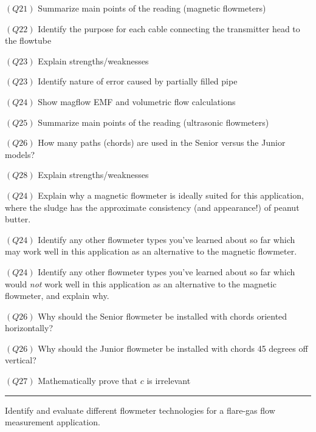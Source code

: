 \medskip
\item{$(Q21)$} Summarize main points of the reading (magnetic flowmeters)
\item{$(Q22)$} Identify the purpose for each cable connecting the transmitter head to the flowtube
\item{$(Q23)$} Explain strengths/weaknesses
\item{$(Q23)$} Identify nature of error caused by partially filled pipe
\item{$(Q24)$} Show magflow EMF and volumetric flow calculations
\item{$(Q25)$} Summarize main points of the reading (ultrasonic flowmeters)
\item{$(Q26)$} How many paths (chords) are used in the Senior versus the Junior models?
\item{$(Q28)$} Explain strengths/weaknesses
\medskip

\medskip
\item{$(Q24)$} Explain why a magnetic flowmeter is ideally suited for this application, where the sludge has the approximate consistency (and appearance!) of peanut butter.
\item{$(Q24)$} Identify any other flowmeter types you've learned about so far which may work well in this application as an alternative to the magnetic flowmeter.
\item{$(Q24)$} Identify any other flowmeter types you've learned about so far which would {\it not} work well in this application as an alternative to the magnetic flowmeter, and explain why.
\item{$(Q26)$} Why should the Senior flowmeter be installed with chords oriented horizontally?
\item{$(Q26)$} Why should the Junior flowmeter be installed with chords 45 degrees off vertical?
\item{$(Q27)$} Mathematically prove that $c$ is irrelevant
\medskip


\filbreak \vskip 5pt \hrule \vskip 5pt  \vskip 10pt

Identify and evaluate different flowmeter technologies for a flare-gas flow measurement application.



\bye



